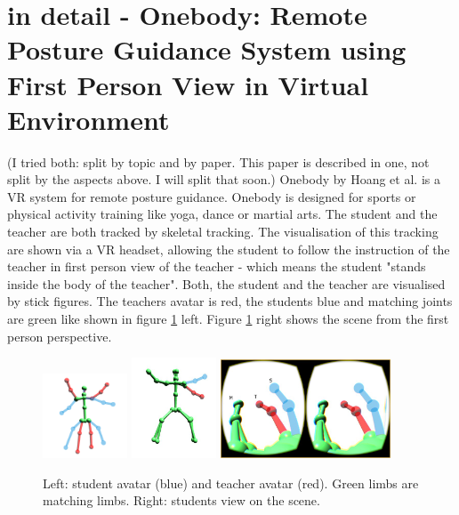 \section{in detail - Onebody: Remote Posture Guidance System using First Person View in Virtual Environment}
(I tried both: split by topic and by paper. This paper is described in one, not split by the aspects above. I will split that soon.)
Onebody by Hoang et al. \cite{Reinoso2016} is a VR system for remote posture guidance. Onebody is designed for sports or physical activity training like yoga, dance or martial arts. The student and the teacher are both tracked by skeletal tracking. The visualisation of this tracking are shown via a VR headset, allowing the student to follow the instruction of the teacher in first person view of the teacher - which means the student "stands inside the body of the teacher". Both, the student and the teacher are visualised by stick figures. The teachers avatar is red, the students blue and matching joints are green like shown in figure \ref{fig:ob1} left. Figure \ref{fig:ob1} right shows the scene from the first person perspective.
\begin{figure}
	\centering
	\includegraphics[width=0.225\textwidth]{img/onebody1.png}
	\includegraphics[width=0.225\textwidth]{img/onebody2.png}
	\includegraphics[width=0.45\textwidth]{img/onebody3.png}
	\caption{Left: student avatar (blue) and teacher avatar (red). Green limbs are matching limbs. Right: students view on the scene.\cite{Reinoso2016}}
	\label{fig:ob1}
\end{figure}
